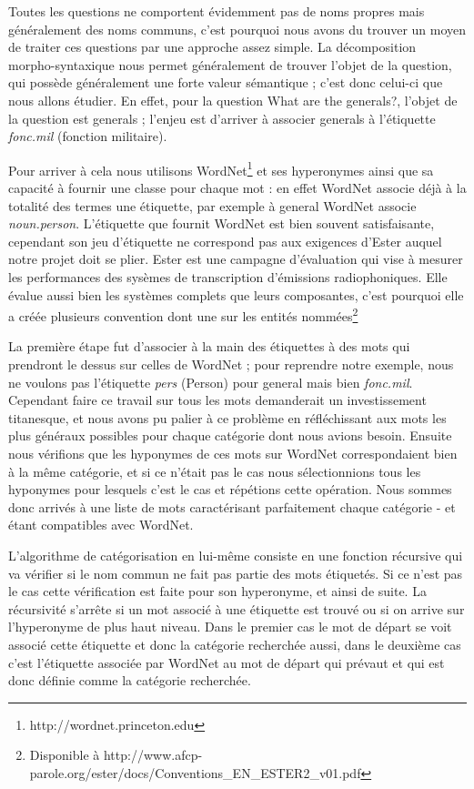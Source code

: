 \documentclass[10pt,a4paper]{article}
\begin{document}
\par Toutes les questions ne comportent évidemment pas de noms propres mais généralement des noms communs, c'est pourquoi nous avons du trouver un moyen de traiter ces questions par une approche assez simple. La décomposition morpho-syntaxique nous permet généralement de trouver l'objet de la question, qui possède généralement une forte valeur sémantique ; c'est donc celui-ci que nous allons étudier. En effet, pour la question \og{}What are the generals?\fg{}, l'objet de la question est \og{}generals\fg{} ; l'enjeu est d'arriver à associer \og{}generals\fg{} à l'étiquette \emph{fonc.mil} (fonction militaire).
\par Pour arriver à cela nous utilisons WordNet\footnote{http://wordnet.princeton.edu} et ses hyperonymes ainsi que sa capacité à fournir une classe pour chaque mot : en effet WordNet associe déjà à la totalité des termes une étiquette, par exemple à \og{}general\fg{} WordNet associe \emph{noun.person}. L'étiquette que fournit WordNet est bien souvent satisfaisante, cependant son jeu d'étiquette ne correspond pas aux exigences d'Ester auquel notre projet doit se plier. Ester est une campagne d'évaluation qui vise à mesurer les performances des sysèmes de transcription d'émissions radiophoniques. Elle évalue aussi bien les systèmes complets que leurs composantes, c'est pourquoi elle a créée plusieurs convention dont une sur les entités nommées\footnote{Disponible à http://www.afcp-parole.org/ester/docs/Conventions\_EN\_ESTER2\_v01.pdf}
\par La première étape fut d'associer \og{}à la main\fg{} des étiquettes à des mots qui prendront le dessus sur celles de WordNet ; pour reprendre notre exemple, nous ne voulons pas l'étiquette \emph{pers} (Person) pour \og{}general\fg{} mais bien \emph{fonc.mil}. Cependant faire ce travail sur tous les mots demanderait un investissement titanesque, et nous avons pu palier à ce problème en réfléchissant aux mots les plus généraux possibles pour chaque catégorie dont nous avions besoin. Ensuite nous vérifions que les hyponymes de ces mots sur WordNet correspondaient bien à la même catégorie, et si ce n'était pas le cas nous sélectionnions tous les hyponymes pour lesquels c'est le cas et répétions cette opération. Nous sommes donc arrivés à une liste de mots caractérisant parfaitement chaque catégorie - et étant compatibles avec WordNet.
\par L'algorithme de catégorisation en lui-même consiste en une fonction récursive qui va vérifier si le nom commun ne fait pas partie des mots étiquetés. Si ce n'est pas le cas cette vérification est faite pour son hyperonyme, et ainsi de suite. La récursivité s'arrête si un mot associé à une étiquette est trouvé ou si on arrive sur l'hyperonyme de plus haut niveau. Dans le premier cas le mot de départ se voit associé cette étiquette et donc la catégorie recherchée aussi, dans le deuxième cas c'est l'étiquette associée par WordNet au mot de départ qui prévaut et qui est donc définie comme la catégorie recherchée.
\end{document}
